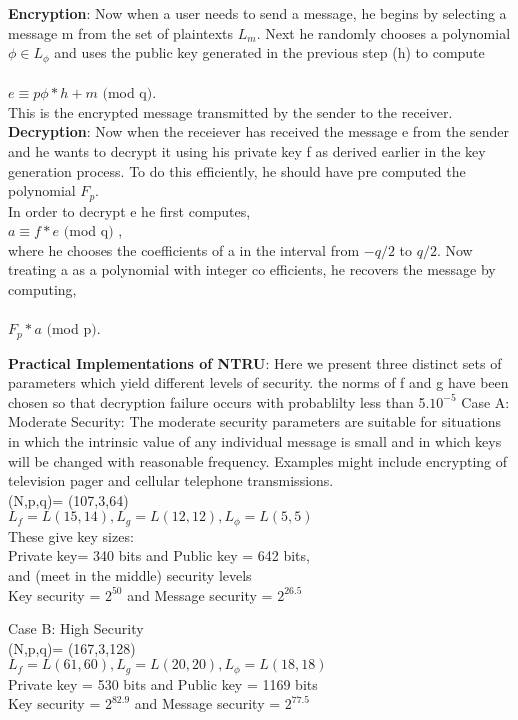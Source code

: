 \documentclass[conference]{IEEEtran}
\begin{document}
\textbf{Encryption}: Now when a user needs to send a message, he begins by selecting a message m from the set of plaintexts $L_m$. Next he randomly chooses a polynomial $\phi \in L_\phi$ and uses the public key generated in the previous step (h) to compute\\
\\ $e \equiv p\phi * h + m$ $\big($mod q$\big)$.\\

This is the encrypted message transmitted by the sender to the receiver.\\

\textbf{Decryption}: Now when the receiever has received the message e from the sender and he wants to decrypt it using his private key f as derived earlier in the key generation process. To do this efficiently, he should have pre computed the polynomial $F_p$.
\\ In order to decrypt e he first computes,\\
$a \equiv f * e $ $\big($mod q$\big)$ , \\
where he chooses the coefficients of a in the interval from $-q/2$ to $q/2$. Now treating a as a polynomial with integer co efficients, he recovers the message by computing, \\
\\ $F_p *a $ $\big($mod p$\big)$.

\textbf{Practical Implementations of NTRU}: Here we present three distinct sets of parameters which yield different levels of security. the norms of f and g have been chosen so that decryption failure occurs with probablilty less than 5.$10^{-5}$
Case A: Moderate Security:
The moderate security parameters are suitable for situations in which the intrinsic value of any individual message is small and in which keys will be changed with reasonable frequency. Examples might include encrypting of television pager and cellular telephone transmissions.\\
 (N,p,q)= (107,3,64)\\
 $L_f = L(15,14) , L_g = L(12,12), L_\phi = L(5,5) $\\

These give key sizes:\\
Private key= 340 bits and Public key = 642 bits,\\
and (meet in the middle) security levels \\
Key security = $2^{50}$ and Message security = $2^{26.5}$

Case B: High Security
\\
(N,p,q)= (167,3,128)\\
 $L_f = L(61,60) , L_g = L(20,20), L_\phi = L(18,18) $\\
 Private key = 530 bits and Public key = 1169 bits\\
 Key security = $2^{82.9}$ and Message security = $2^{77.5}$\\
 
\end{document}
